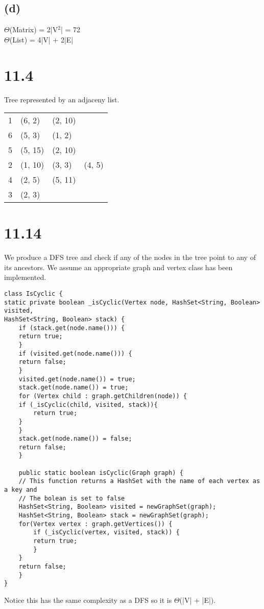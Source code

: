 \documentclass[11pt]{article}
\begin{document}
\subsection{(d)}
\label{sec:orgfa9adcd}
\(\Theta\)(Matrix) = 2|V\(^{\text{2}}\)| = 72\\
\(\Theta\)(List) = 4|V| + 2|E|\\
\section{11.4}
\label{sec:orga60b04c}
Tree represented by an adjaceny list.\\
\begin{center}
\begin{tabular}{rlll}
1 & (6, 2) & (2, 10) & \\
6 & (5, 3) & (1, 2) & \\
5 & (5, 15) & (2, 10) & \\
2 & (1, 10) & (3, 3) & (4, 5)\\
4 & (2, 5) & (5, 11) & \\
3 & (2, 3) &  & \\
\end{tabular}
\end{center}
\section{11.14}
\label{sec:orge60a311}
We produce a DFS tree and check if any of the nodes in the tree point to any of\\
its ancestors. We assume an appropriate graph and vertex class has been implemented.\\
\begin{verbatim}
class IsCyclic {
static private boolean _isCyclic(Vertex node, HashSet<String, Boolean> visited,
HashSet<String, Boolean> stack) {
    if (stack.get(node.name())) {
	return true;
    }
    if (visited.get(node.name())) {
	return false;
    }
    visited.get(node.name()) = true;
    stack.get(node.name()) = true;
    for (Vertex child : graph.getChildren(node)) {
	if (_isCyclic(child, visited, stack)){
	    return true;
	}
    }
    stack.get(node.name()) = false;
    return false;
    }

    public static boolean isCyclic(Graph graph) {
	// This function returns a HashSet with the name of each vertex as a key and
	// The bolean is set to false
	HashSet<String, Boolean> visited = newGraphSet(graph);
	HashSet<String, Boolean> stack = newGraphSet(graph);
	for(Vertex vertex : graph.getVertices()) {
	    if (_isCyclic(vertex, visited, stack)) {
		return true;
	    }
	}
	return false;
    }
}
\end{verbatim}
Notice this has the same complexity as a DFS so it is \(\Theta\)(|V| + |E|).\\
\end{document}

